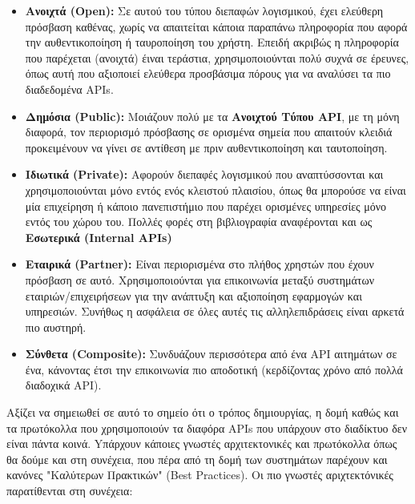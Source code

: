 \begin{itemize}
	\item \textbf{Ανοιχτά (Open):} Σε αυτού του τύπου διεπαφών λογισμικού, έχει ελεύθερη πρόσβαση καθένας,
		χωρίς να απαιτείται κάποια παραπάνω πληροφορία που αφορά την αυθεντικοποίηση ή ταυροποίηση του χρήστη.
		Επειδή ακριβώς η πληροφορία που παρέχεται (ανοιχτά) έιναι τεράστια, χρησιμοποιούνται πολύ
		συχνά σε έρευνες, όπως αυτή \cite{open_restful_api_analysis} που αξιοποιεί ελεύθερα προσβάσιμα
		πόρους για να αναλύσει τα πιο διαδεδομένα APIs. 
	\item \textbf{Δημόσια (Public):} Μοιάζουν πολύ με τα \textbf{Ανοιχτού Τύπου API}, με τη μόνη διαφορά, τον περιορισμό
		πρόσβασης σε ορισμένα σημεία που απαιτούν κλειδιά προκειμένουν να γίνει σε αντίθεση με πριν αυθεντικοποίηση και ταυτοποίηση. 
	\item \textbf{Ιδιωτικά (Private):} Αφορούν διεπαφές λογισμικού που αναπτύσσονται και χρησιμοποιούνται μόνο εντός ενός κλειστού
		πλαισίου, όπως θα μπορούσε να είναι μία επιχείρηση ή κάποιο πανεπιστήμιο που παρέχει ορισμένες υπηρεσίες μόνο εντός του χώρου του.
		Πολλές φορές στη βιβλιογραφία αναφέρονται και ως \textbf{Εσωτερικά (Internal APIs)}
	\item \textbf{Εταιρικά (Partner):} Είναι περιορισμένα στο πλήθος χρηστών που έχουν πρόσβαση σε αυτό. Χρησιμοποιούνται
		για επικοινωνία μεταξύ συστημάτων εταιριών/επιχειρήσεων για την ανάπτυξη και αξιοποίηση εφαρμογών και υπηρεσιών.
		Συνήθως η ασφάλεια σε όλες αυτές τις αλληλεπιδράσεις είναι αρκετά πιο αυστηρή.
	\item \textbf{Σύνθετα (Composite):} Συνδυάζουν περισσότερα από ένα API αιτημάτων σε ένα, κάνοντας έτσι 
		την επικοινωνία πιο αποδοτική (κερδίζοντας χρόνο από πολλά διαδοχικά API).
\end{itemize}

Αξίζει να σημειωθεί σε αυτό το σημείο ότι ο τρόπος δημιουργίας, η δομή καθώς και τα πρωτόκολλα που χρησιμοποιούν τα διαφόρα APIs που υπάρχουν στο διαδίκτυο
δεν είναι πάντα κοινά. Yπάρχουν κάποιες γνωστές αρχιτεκτονικές και πρωτόκολλα όπως θα δούμε και στη συνέχεια, που πέρα από τη δομή
των συστημάτων παρέχουν και κανόνες "Καλύτερων Πρακτικών" (Best Practices). Οι πιο γνωστές αριχτεκτόνικές
παρατίθενται στη συνέχεια:

